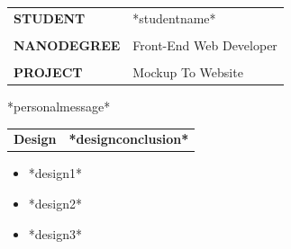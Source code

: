 \documentclass{scrartcl}
\begin{document}

\begin{center}
\end{center}


\begin{table} [h]
\begin{tabular}{l l}
\textbf{\normalsize{\color{mygray}STUDENT}} & \Huge{*studentname*} \\
\\
\textbf{\normalsize{\color{mygray}NANODEGREE} } & \Large{Front-End Web Developer} \\
\\
\textbf{\normalsize{\color{mygray}PROJECT}} & \Large{Mockup To Website}

\end{tabular}
\end{table}

\noindent\makebox[\linewidth]{\rule{\textwidth}{0.4pt}}



 \vspace{0.5 cm}


*personalmessage*

\begin{table} [H]
	\begin{tabular}{l c}
		\Large{\textbf{Design} } & \textcolor{cerulean}{\textbf{*designconclusion*}} \\
	\end{tabular}
\end{table}


\begin{itemize}
	 \item *design1*

	 
	 
	\item *design2*

	
	\item *design3*

\end{itemize}
\end{document}
